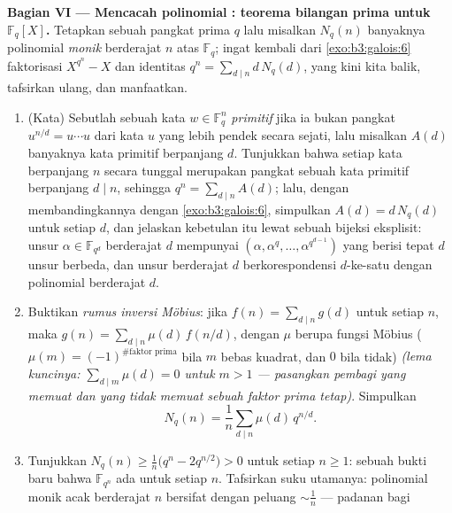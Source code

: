 \begin{problem}
\medskip
\noindent\textbf{Bagian VI --- Mencacah polinomial :
teorema bilangan prima untuk $\mathbb F_q[X]$.} Tetapkan sebuah pangkat prima
$q$ lalu misalkan $N_q(n)$ banyaknya polinomial \emph{monik }
berderajat $n$ atas $\mathbb F_q$; ingat kembali dari
\cref{exo:b3:galois:6} faktorisasi $X^{q^n} - X$ dan
identitas $q^n = \sum_{d\mid n}d\,N_q(d)$, yang kini kita
balik, tafsirkan ulang, dan manfaatkan.
\begin{enumerate}[resume]
  \item (Kata) Sebutlah sebuah kata $w \in \mathbb F_q^n$
        \emph{primitif} jika ia bukan pangkat $u^{n/d} =
        u\cdots u$ dari kata $u$ yang lebih pendek secara sejati, lalu misalkan
        $A(d)$ banyaknya kata primitif berpanjang $d$.
        Tunjukkan bahwa setiap kata berpanjang $n$ secara tunggal merupakan pangkat
        sebuah kata primitif berpanjang $d \mid n$, sehingga
        $q^n = \sum_{d \mid n}A(d)$; lalu, dengan membandingkannya dengan
        \cref{exo:b3:galois:6}, simpulkan $A(d) = d\,N_q(d)$
        untuk setiap $d$, dan jelaskan kebetulan itu lewat sebuah
        bijeksi eksplisit: unsur $\alpha \in
        \mathbb F_{q^d}$ berderajat $d$ mempunyai  
        $(\alpha, \alpha^q, \dots, \alpha^{q^{d-1}})$ yang berisi
        tepat $d$ unsur berbeda, dan unsur berderajat
        $d$ berkorespondensi $d$-ke-satu dengan polinomial  berderajat
        $d$.
  \item Buktikan \emph{rumus inversi Möbius}: jika $f(n) =
        \sum_{d\mid n}g(d)$ untuk setiap $n$, maka $g(n) =
        \sum_{d\mid n}\mu(d)\,f(n/d)$, dengan $\mu$ berupa
        fungsi Möbius ($\mu(m) = (-1)^{\#\text{faktor
        prima}}$ bila $m$ bebas kuadrat, dan $0$ bila tidak)
        \emph{(lema kuncinya: $\sum_{d \mid m}\mu(d) = 0$ untuk $m >
        1$ --- pasangkan pembagi yang memuat dan yang tidak memuat sebuah
        faktor prima tetap)}. Simpulkan
        \[
        N_q(n) = \frac1n\sum_{d \mid n}\mu(d)\,q^{n/d} .
        \]
  \item Tunjukkan $N_q(n) \geq \frac1n\bigl(q^n - 2q^{n/2}\bigr) > 0$
        untuk setiap $n \geq 1$: sebuah bukti baru bahwa $\mathbb F_{q^n}$
        ada untuk setiap $n$. Tafsirkan suku utamanya: polinomial
        monik acak berderajat $n$ bersifat  dengan
        peluang $\sim \frac1n$ --- padanan  bagi

\end{enumerate}
\end{problem}
